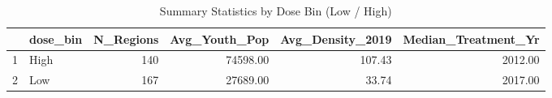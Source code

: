 \begin{table}[ht]
\centering
\begin{tabular}{rlrrrr}
  \hline
 & dose\_bin & N\_Regions & Avg\_Youth\_Pop & Avg\_Density\_2019 & Median\_Treatment\_Yr \\ 
  \hline
1 & High & 140 & 74598.00 & 107.43 & 2012.00 \\ 
  2 & Low & 167 & 27689.00 & 33.74 & 2017.00 \\ 
   \hline
\end{tabular}
\caption{Summary Statistics by Dose Bin (Low / High)} 
\end{table}
